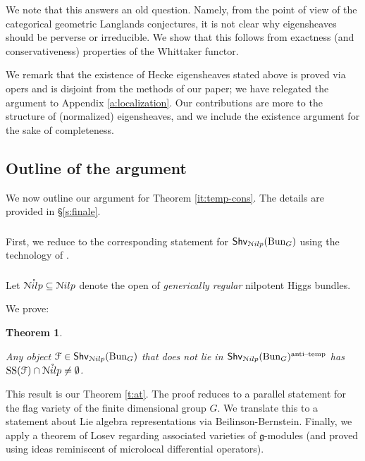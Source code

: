 \documentclass[reqno,11pt]{amsart}
\numberwithin{equation}{subsection}
\newtheorem{introthm}{Theorem}
\theoremstyle{remark}
\newcommand{\sF}{{\EuScript F}}
\newcommand{\sN}{{\EuScript N}}
\newcommand{\fg}{{\mathfrak g}}
\newcommand{\on}{\operatorname}
\newcommand{\mathendash}{\text{\textendash}}
\newcommand{\Bun}{\on{Bun}}
\renewcommand{\o}[1]{\mathring{#1}}
\renewcommand{\subset}{\subseteq}
\newcommand{\Shv}{\mathsf{Shv}}
\newcommand{\at}{\on{anti}\!\mathendash\!\on{temp}}
\newcommand{\Nilp}{\sN ilp}
\renewcommand{\SS}{\on{SS}}
\begin{document}
We note that this answers an old question. Namely, from the point of view of the
categorical geometric Langlands conjectures, it is not clear why 
eigensheaves should be perverse or irreducible. We show that this
follows from exactness (and conservativeness) properties of the Whittaker functor.

We remark that the existence of Hecke eigensheaves stated above is
proved via opers and is disjoint from the methods of our paper; we have
relegated the argument to Appendix \ref{a:localization}. Our contributions
are more to the structure of (normalized) eigensheaves, and we include the
existence argument for the sake of completeness.

\subsection{Outline of the argument}

We now outline our argument for Theorem \ref{it:temp-cons}.
The details are provided in \S \ref{s:finale}.

\subsubsection{}

First, we reduce to the corresponding statement
for $\Shv_{\Nilp}(\Bun_G)$ using the technology of
\cite{agkrrv1}.

\subsubsection{}

Let $\o{\Nilp} \subset \Nilp$ denote the open 
of \emph{generically regular} nilpotent Higgs bundles.

We prove:

\begin{introthm}\label{it:at}

Any object $\sF\in \Shv_{\Nilp}(\Bun_G)$ that does not lie in 
$\Shv_{\Nilp}(\Bun_G)^{\at}$ has $\SS(\sF) \cap \o{\Nilp} \neq \emptyset$.

\end{introthm}

This result is our Theorem \ref{t:at}. The proof reduces to a parallel statement
for the flag variety of the finite dimensional group $G$. 
We translate this to a statement about Lie algebra representations
via Beilinson-Bernstein. Finally, we apply a theorem of Losev \cite{losev-holonomic}
regarding associated varieties of $\fg$-modules (and proved
using ideas reminiscent of microlocal differential operators).
\end{document}
